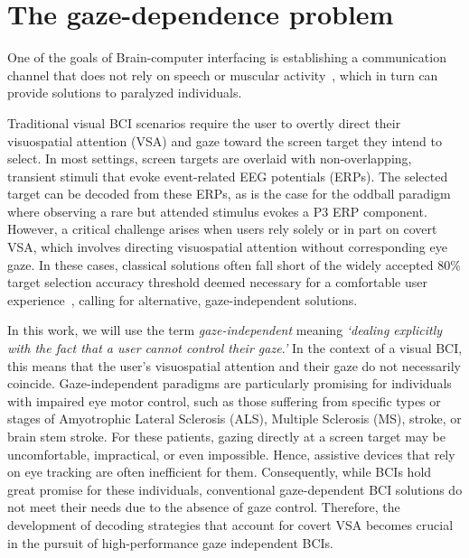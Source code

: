 
\section{The gaze-dependence problem}

One of the goals of Brain-computer interfacing is establishing a communication
channel that does not rely on speech or
muscular activity~\cite{Naci2012,Chaudhary2016}, which in turn can provide
solutions to paralyzed individuals.

Traditional visual BCI scenarios require the user to overtly direct their
visuospatial attention (VSA) and gaze toward the screen target they intend to select.
In most settings, screen targets are overlaid with non-overlapping, transient
stimuli that evoke event-related EEG potentials (ERPs).
The selected target can be decoded from these ERPs, as is the case for the
oddball paradigm where observing a rare but attended stimulus evokes a P3 ERP
component.
However, a critical challenge arises when users rely solely or in part on covert
VSA, which involves directing visuospatial attention without corresponding eye gaze.
In these cases, classical solutions often fall short of the widely accepted
80\% target selection accuracy threshold deemed necessary for a comfortable user
experience~\cite{Brunner2010,Frenzel2011,Treder2010,Ron2019,Neeling2019},
calling for alternative, gaze-independent solutions.

In this work, we will use the term \emph{gaze-independent} meaning
\emph{‘dealing explicitly with the fact that a user cannot control their
gaze.'}
In the context of a visual BCI, this means that the user's
visuospatial attention and their gaze do not necessarily coincide.
Gaze-independent paradigms are particularly
promising for individuals with impaired eye motor control, such as those
suffering from specific types or stages of Amyotrophic Lateral Sclerosis (ALS),
Multiple Sclerosis (MS), stroke, or brain stem
stroke.
For these patients, gazing directly at a screen target may be uncomfortable, impractical,
or even impossible.
Hence, assistive devices that rely on eye tracking are often inefficient for
them.
Consequently, while BCIs hold great promise for these individuals, conventional
gaze-dependent BCI solutions do not meet their needs due to the absence of gaze
control. Therefore, the development of decoding strategies that account for covert
VSA becomes crucial in the pursuit of high-performance gaze independent
BCIs.

